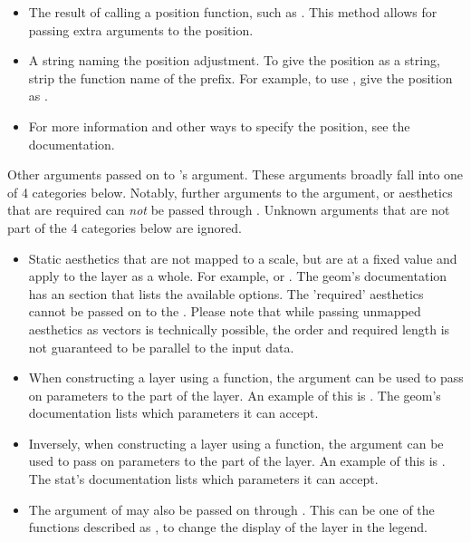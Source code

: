 \documentclass[letterpaper]{book}
\begin{document}
\begin{Arguments}
\begin{ldescription}
\begin{itemize}
\item{} The result of calling a position function, such as .
This method allows for passing extra arguments to the position.
\item{} A string naming the position adjustment. To give the position as a
string, strip the function name of the  prefix. For example,
to use , give the position as .
\item{} For more information and other ways to specify the position, see the
 documentation.

\end{itemize}


\item[\code{...}] Other arguments passed on to 's  argument. These
arguments broadly fall into one of 4 categories below. Notably, further
arguments to the  argument, or aesthetics that are required
can \emph{not} be passed through . Unknown arguments that are not part
of the 4 categories below are ignored.
\begin{itemize}

\item{} Static aesthetics that are not mapped to a scale, but are at a fixed
value and apply to the layer as a whole. For example, 
or . The geom's documentation has an 
section that lists the available options. The 'required' aesthetics
cannot be passed on to the . Please note that while passing
unmapped aesthetics as vectors is technically possible, the order and
required length is not guaranteed to be parallel to the input data.
\item{} When constructing a layer using
a  function, the  argument can be used to pass on
parameters to the  part of the layer. An example of this is
. The geom's
documentation lists which parameters it can accept.
\item{} Inversely, when constructing a layer using a
 function, the  argument can be used to pass on parameters
to the  part of the layer. An example of this is
. The stat's documentation
lists which parameters it can accept.
\item{} The  argument of  may also be passed on through
. This can be one of the functions described as
, to change the display of the layer in the legend.


\end{itemize}
\end{ldescription}
\end{Arguments}
\end{document}
